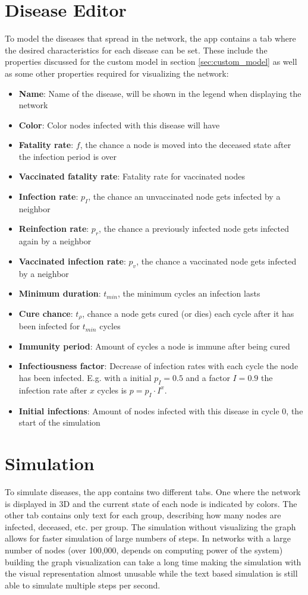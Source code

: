 \section{Disease Editor}
To model the diseases that spread in the network, the app contains a tab where the desired characteristics for each disease can be set. These include the properties discussed for the custom model in
section \ref{sec:custom_model} as well as some other properties required for visualizing the network:
\begin{itemize}
    \item \textbf{Name}: Name of the disease, will be shown in the legend when displaying the network
    \item \textbf{Color}: Color nodes infected with this disease will have
    \item \textbf{Fatality rate}: $f$, the chance a node is moved into the deceased state after the infection period is over
    \item \textbf{Vaccinated fatality rate}: Fatality rate for vaccinated nodes
    \item \textbf{Infection rate}: $p_I$, the chance an unvaccinated node gets infected by a neighbor
    \item \textbf{Reinfection rate}: $p_r$, the chance a previously infected node gets infected again by a neighbor
    \item \textbf{Vaccinated infection rate}: $p_v$, the chance a vaccinated node gets infected by a neighbor
    \item \textbf{Minimum duration}: $t_{min}$, the minimum cycles an infection lasts
    \item \textbf{Cure chance}: $t_\rho$, chance a node gets cured (or dies) each cycle after it has been
    infected for $t_{min}$ cycles
    \item \textbf{Immunity period}: Amount of cycles a node is immune after being cured
    \item \textbf{Infectiousness factor}: Decrease of infection rates with each cycle the node has been infected.
    E.g. with a initial $p_I = 0.5$ and a factor $I = 0.9$ the infection rate after $x$ cycles is $p = p_I \cdot I^x$.
    \item \textbf{Initial infections}: Amount of nodes infected with this disease in cycle 0, the start of the simulation
\end{itemize}

\section{Simulation}
To simulate diseases, the app contains two different tabs. One where the network is displayed
in 3D and the current state of each node is indicated by colors. The other tab contains only
text for each group, describing how many nodes are infected, deceased, etc. per group. The simulation
without visualizing the graph allows for faster simulation of large numbers of steps. In
networks with a large number of nodes (over 100,000, depends on computing power of the system)
building the graph visualization can take a long time making the simulation with the visual representation almost unusable while the text based simulation is still able to simulate multiple steps per second.


